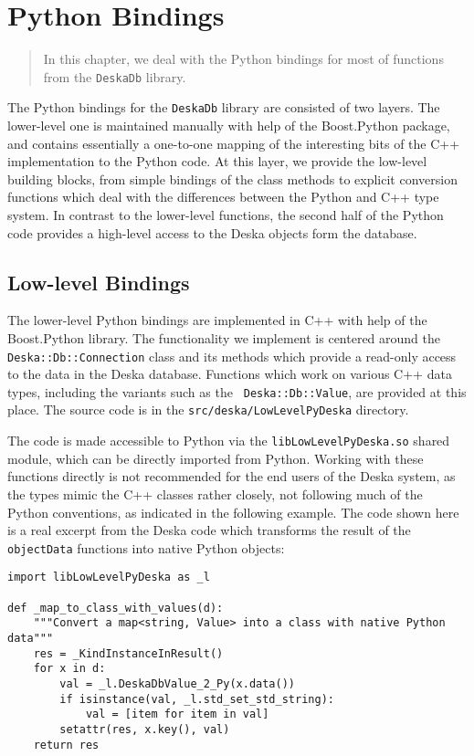 \documentclass[deska]{subfiles}
\begin{document}
\chapter{Python Bindings}

\begin{abstract}
In this chapter, we deal with the Python bindings for most of functions from the  {\tt DeskaDb} library.
\end{abstract}

The Python bindings for the {\tt DeskaDb} library are consisted of two layers.  The lower-level one is maintained
manually with help of the Boost.Python package, and contains essentially a one-to-one mapping of the interesting bits of
the C++ implementation to the Python code.  At this layer, we provide the low-level building blocks, from simple
bindings of the class methods to explicit conversion functions which deal with the differences between the Python and
C++ type system.  In contrast to the lower-level functions, the second half of the Python code provides a high-level
access to the Deska objects form the database.

\section{Low-level Bindings}

The lower-level Python bindings are implemented in C++ with help of the Boost.Python library.  The functionality we
implement is centered around the {\tt Deska::Db::Connection} class and its methods which provide a read-only access to
the data in the Deska database.  Functions which work on various C++ data types, including the variants such as the {\tt
Deska::Db::Value}, are provided at this place.  The source code is in the {\tt src/deska/LowLevelPyDeska} directory.

The code is made accessible to Python via the {\tt libLowLevelPyDeska.so} shared module, which can be directly imported
from Python.  Working with these functions directly is not recommended for the end users of the Deska system, as the
types mimic the C++ classes rather closely, not following much of the Python conventions, as indicated in the following
example.  The code shown here is a real excerpt from the Deska code which transforms the result of the {\tt objectData}
functions into native Python objects:

\begin{verbatim}
import libLowLevelPyDeska as _l

def _map_to_class_with_values(d):
    """Convert a map<string, Value> into a class with native Python data"""
    res = _KindInstanceInResult()
    for x in d:
        val = _l.DeskaDbValue_2_Py(x.data())
        if isinstance(val, _l.std_set_std_string):
            val = [item for item in val]
        setattr(res, x.key(), val)
    return res
\end{verbatim}
\end{document}
